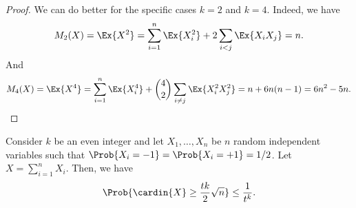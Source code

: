 \begin{proof}
    We can do better for the specific cases $k=2$ and $k=4$. Indeed,
    we have
    \begin{equation*}
        M_2(X)%
        =%
        \Ex{  X^{2}}%
        =%
        \sum_{i=1}^n \Ex{X_i^2} + 2\sum_{i < j} \Ex{X_i X_j}
        =%
        n.
    \end{equation*}
    And
    \begin{equation*}
        M_4(X)%
        =%
        \Ex{  X^{4}}%
        =%
        \sum_{i=1}^n \Ex{X_i^4} + \binom{4}{2}\sum_{i \neq j} \Ex{X_i^2 X_j^2}
        =%
        n + 6 n(n-1)
        =%
        6n^2 - 5n.
    \end{equation*}

\end{proof}


\begin{lemma}
    Consider $k$ be an even integer and let $X_1, \ldots, X_n$ be $n$
    random independent variables such that
    $\Prob{X_i=-1} = \Prob{X_i =+1} = 1/2$. Let
    $X = \sum_{i=1}^n X_i$. Then, we have
    \begin{align*}
      \Prob{\cardin{X} \geq \frac{tk}{2} \sqrt{n}}%
      \leq%
      \frac{1}{t^k}.
    \end{align*}
\end{lemma}
